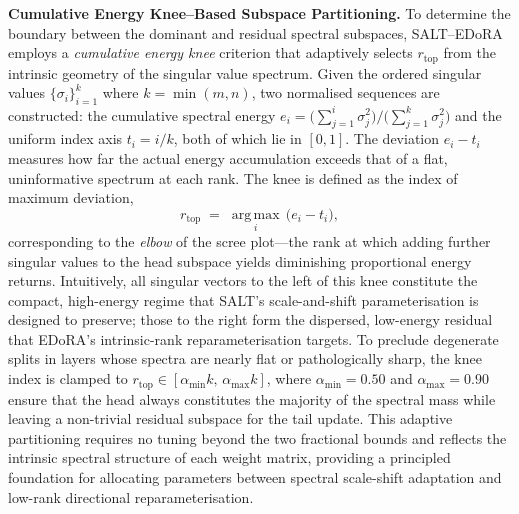 \vspace{4pt}
\noindent
\textbf{Cumulative Energy Knee–Based Subspace Partitioning.}
To determine the boundary between the dominant and residual spectral subspaces,
SALT–EDoRA employs a \emph{cumulative energy knee} criterion that adaptively selects
\(r_{\text{top}}\) from the intrinsic geometry of the singular value spectrum.
Given the ordered singular values \(\{\sigma_i\}_{i=1}^{k}\) where \(k = \min(m,n)\),
two normalised sequences are constructed:
the cumulative spectral energy
\(e_i = \bigl(\sum_{j=1}^{i} \sigma_j^2\bigr) \big/ \bigl(\sum_{j=1}^{k} \sigma_j^2\bigr)\)
and the uniform index axis
\(t_i = i / k\),
both of which lie in \([0, 1]\).
The deviation \(e_i - t_i\) measures how far the actual energy accumulation exceeds
that of a flat, uninformative spectrum at each rank.
The knee is defined as the index of maximum deviation,
\begin{equation}
    r_{\text{top}} \;=\; \operatorname*{arg\,max}_{i}\,\bigl(e_i - t_i\bigr),
    \label{eq:knee}
\end{equation}
corresponding to the \emph{elbow} of the scree plot—the rank at which adding further
singular values to the head subspace yields diminishing proportional energy returns.
Intuitively, all singular vectors to the left of this knee constitute the compact,
high-energy regime that SALT's scale-and-shift parameterisation is designed to
preserve; those to the right form the dispersed, low-energy residual that EDoRA's
intrinsic-rank reparameterisation targets.
To preclude degenerate splits in layers whose spectra are nearly flat or
pathologically sharp, the knee index is clamped to
\(r_{\text{top}} \in [\alpha_{\min} k,\, \alpha_{\max} k]\),
where \(\alpha_{\min} = 0.50\) and \(\alpha_{\max} = 0.90\) ensure
that the head always constitutes the majority of the spectral mass
while leaving a non-trivial residual subspace for the tail update.
This adaptive partitioning requires no tuning beyond the two fractional bounds
and reflects the intrinsic spectral structure of each weight matrix,
providing a principled foundation for allocating parameters between
spectral scale-shift adaptation and low-rank directional reparameterisation.
